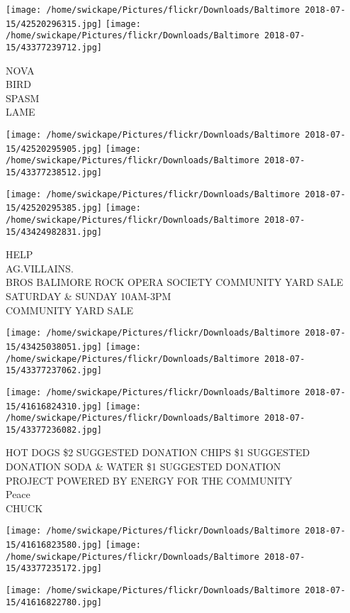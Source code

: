 \documentclass[10pt,letterpaper]{article}
\begin{document}
\texttt{[image: /home/swickape/Pictures/flickr/Downloads/Baltimore 2018-07-15/42520296315.jpg]}
\texttt{[image: /home/swickape/Pictures/flickr/Downloads/Baltimore 2018-07-15/43377239712.jpg]}

NOVA\\
BIRD\\
SPASM\\
LAME\\
\pagebreak

\texttt{[image: /home/swickape/Pictures/flickr/Downloads/Baltimore 2018-07-15/42520295905.jpg]}
\texttt{[image: /home/swickape/Pictures/flickr/Downloads/Baltimore 2018-07-15/43377238512.jpg]}

\texttt{[image: /home/swickape/Pictures/flickr/Downloads/Baltimore 2018-07-15/42520295385.jpg]}
\texttt{[image: /home/swickape/Pictures/flickr/Downloads/Baltimore 2018-07-15/43424982831.jpg]}

HELP\\
AG.VILLAINS.\\
BROS BALIMORE ROCK OPERA SOCIETY COMMUNITY YARD SALE SATURDAY \& SUNDAY 10AM{-}3PM\\
COMMUNITY YARD SALE\\
\pagebreak

\texttt{[image: /home/swickape/Pictures/flickr/Downloads/Baltimore 2018-07-15/43425038051.jpg]}
\texttt{[image: /home/swickape/Pictures/flickr/Downloads/Baltimore 2018-07-15/43377237062.jpg]}

\texttt{[image: /home/swickape/Pictures/flickr/Downloads/Baltimore 2018-07-15/41616824310.jpg]}
\texttt{[image: /home/swickape/Pictures/flickr/Downloads/Baltimore 2018-07-15/43377236082.jpg]}

HOT DOGS \$2 SUGGESTED DONATION CHIPS \$1 SUGGESTED DONATION SODA \& WATER \$1 SUGGESTED DONATION\\
PROJECT POWERED BY ENERGY FOR THE COMMUNITY\\
Peace\\
CHUCK\\
\pagebreak

\texttt{[image: /home/swickape/Pictures/flickr/Downloads/Baltimore 2018-07-15/41616823580.jpg]}
\texttt{[image: /home/swickape/Pictures/flickr/Downloads/Baltimore 2018-07-15/43377235172.jpg]}

\vspace{0.25in}
\texttt{[image: /home/swickape/Pictures/flickr/Downloads/Baltimore 2018-07-15/41616822780.jpg]}
\end{document}
